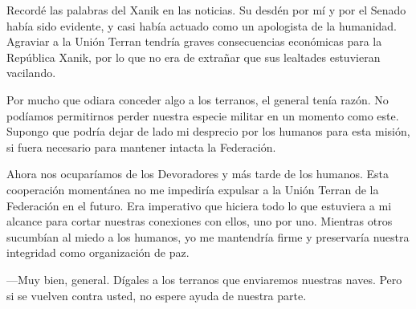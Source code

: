 Recordé las palabras del Xanik en las noticias. Su desdén por mí y por el Senado había sido evidente, y casi había actuado como un apologista de la humanidad. Agraviar a la Unión Terran tendría graves consecuencias económicas para la República Xanik, por lo que no era de extrañar que sus lealtades estuvieran vacilando.

Por mucho que odiara conceder algo a los terranos, el general tenía razón. No podíamos permitirnos perder nuestra especie militar en un momento como este. Supongo que podría dejar de lado mi desprecio por los humanos para esta misión, si fuera necesario para mantener intacta la Federación.

Ahora nos ocuparíamos de los Devoradores y más tarde de los humanos. Esta cooperación momentánea no me impediría expulsar a la Unión Terran de la Federación en el futuro. Era imperativo que hiciera todo lo que estuviera a mi alcance para cortar nuestras conexiones con ellos, uno por uno. Mientras otros sucumbían al miedo a los humanos, yo me mantendría firme y preservaría nuestra integridad como organización de paz.

—Muy bien, general. Dígales a los terranos que enviaremos nuestras naves. Pero si se vuelven contra usted, no espere ayuda de nuestra parte.

